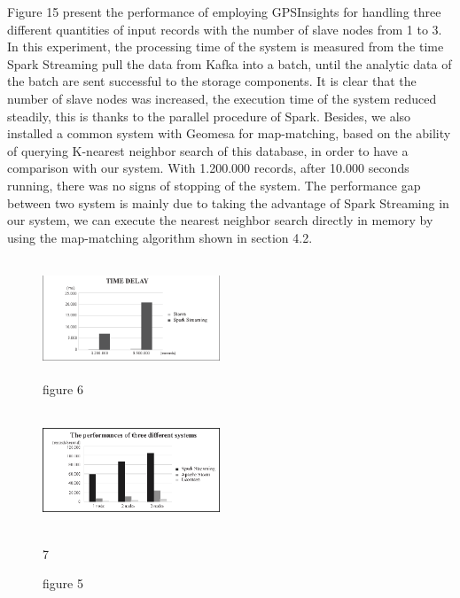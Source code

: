 \documentclass{acm_proc_article-sp}
\begin{document}
Figure 15 present the performance of employing GPSInsights for handling three different quantities of input records with the number of slave nodes from 1 to 3. In this experiment, the processing time of the system is measured from the time Spark Streaming pull the data from Kafka into a batch, until the analytic data of the batch are sent successful to the storage components. It is clear that the number of slave nodes was increased, the execution time of the system reduced steadily, this is thanks to the parallel procedure of Spark. Besides, we also installed a common system with Geomesa for map-matching, based on the ability of querying K-nearest neighbor search of this database, in order to have a comparison with our system. With 1.200.000 records, after 10.000 seconds running, there was no signs of stopping of the system. The performance gap between two system is mainly due to taking the advantage of Spark Streaming in our system,  we can execute the nearest neighbor search directly in memory by using the map-matching algorithm shown in section 4.2.

	\begin{figure}
		\centering
		\includegraphics[height=100pt,width=150pt]{thesis-6}
		\caption{figure 6}
	\end{figure}
	
		\begin{figure}
		\centering
		\includegraphics[height=100pt,width=150pt]{thesis-7}
		\caption{figure 5}7
	\end{figure}
	
\end{document}
